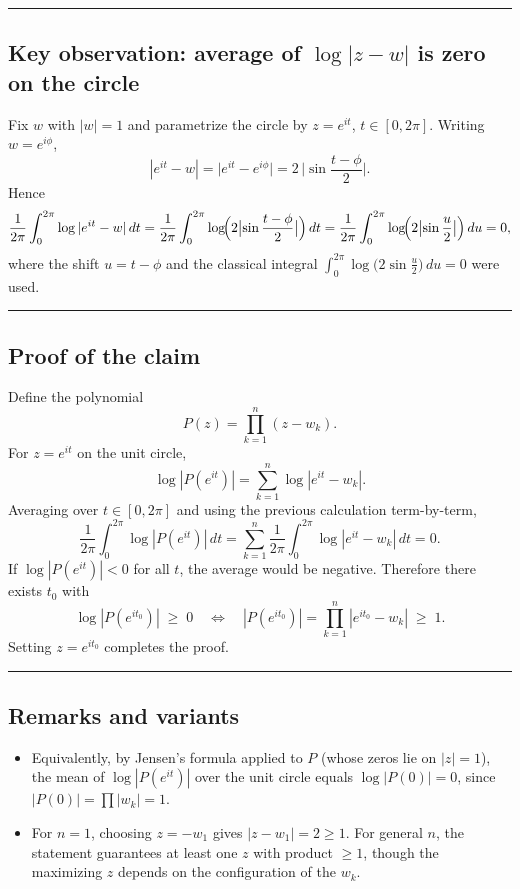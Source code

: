 \documentclass[11pt]{article}
\begin{document}
\bigskip\hrule\bigskip

\subsection*{Key observation: average of $\log|z-w|$ is zero on the circle}

Fix $w$ with $|w|=1$ and parametrize the circle by $z=e^{it}$, $t\in[0,2\pi]$.
Writing $w=e^{i\phi}$,
\[
|e^{it}-w|
= \bigl|e^{it}-e^{i\phi}\bigr|
= 2\,\bigl|\sin\frac{t-\phi}{2}\bigr|.
\]
Hence
\[
\frac1{2\pi}\int_0^{2\pi}\log|e^{it}-w|\,dt
= \frac1{2\pi}\int_0^{2\pi}\log\!\Bigl(2\bigl|\sin\frac{t-\phi}{2}\bigr|\Bigr)\,dt
= \frac1{2\pi}\int_0^{2\pi}\log\!\Bigl(2\bigl|\sin\frac{u}{2}\bigr|\Bigr)\,du
= 0,
\]
where the shift $u=t-\phi$ and the classical integral
$\displaystyle \int_0^{2\pi}\log\!\bigl(2\sin\frac{u}{2}\bigr)\,du=0$ were used.

\bigskip\hrule\bigskip

\subsection*{Proof of the claim}

Define the polynomial
\[
P(z)=\prod_{k=1}^n (z-w_k).
\]
For $z=e^{it}$ on the unit circle,
\[
\log |P(e^{it})|=\sum_{k=1}^n \log|e^{it}-w_k|.
\]
Averaging over $t\in[0,2\pi]$ and using the previous calculation term-by-term,
\[
\frac1{2\pi}\int_0^{2\pi} \log |P(e^{it})|\,dt
=\sum_{k=1}^n \frac1{2\pi}\int_0^{2\pi} \log|e^{it}-w_k|\,dt
= 0.
\]
If $\log |P(e^{it})|<0$ for all $t$, the average would be negative. Therefore there exists $t_0$ with
\[
\log|P(e^{it_0})|\;\ge\;0
\quad\Longleftrightarrow\quad
|P(e^{it_0})|=\prod_{k=1}^n |e^{it_0}-w_k|\;\ge\;1.
\]
Setting $z=e^{it_0}$ completes the proof.

\bigskip\hrule\bigskip

\subsection*{Remarks and variants}

\begin{itemize}
	\item Equivalently, by Jensen’s formula applied to $P$ (whose zeros lie on $|z|=1$), the mean of $\log|P(e^{it})|$ over the unit circle equals $\log|P(0)|=0$, since $|P(0)|=\prod |w_k|=1$.
	\item For $n=1$, choosing $z=-w_1$ gives $|z-w_1|=2\ge1$. For general $n$, the statement guarantees at least one $z$ with product $\ge1$, though the maximizing $z$ depends on the configuration of the $w_k$.
\end{itemize}
\end{document}
